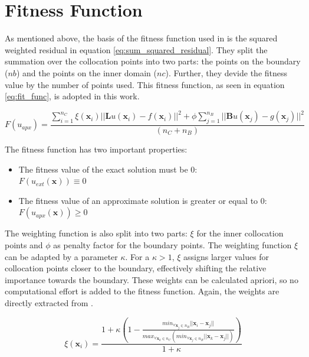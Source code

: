 \documentclass[./\jobname.tex]{subfiles}
\begin{document}
\section{Fitness Function}
\label{chap:fit_func}

As mentioned above, the basis of the fitness function used in \cite{chaquet_using_2019} is the squared weighted residual in equation \ref{eq:sum_squared_residual}. They split the summation over the collocation points into two parts: the points on the boundary ($nb$) and the points on the inner domain ($nc$). Further, they devide the fitness value by the number of points used. This fitness function, as seen in equation \ref{eq:fit_func}, is adopted in this work. 

\begin{equation}
\label{eq:fit_func}
F(u_{apx}) = \frac{\sum_{i=1}^{n_C} \xi (\mathbf{x}_i) || \mathbf{L}u(\mathbf{x}_i) - f(\mathbf{x}_i)||^2 + \phi \sum_{j=1}^{n_B} || \mathbf{B}u(\mathbf{x}_j) - g(\mathbf{x}_j)||^2}{(n_C + n_B)}  
\end{equation}

The fitness function has two important properties: 
\begin{itemize}
	\item The fitness value of the exact solution must be 0:\\
	$F(u_{ext}(\mathbf{x})) \equiv 0$ 
	\item The fitness value of an approximate solution is greater or equal to 0: \\
	$F(u_{apx}(\mathbf{x})) \geq 0$
\end{itemize}
 

The weighting function is also split into two parts: $\xi$ for the inner collocation points and $\phi$ as penalty factor for the boundary points. The weighting function $\xi$ can be adapted by a parameter $\kappa$. For a $\kappa > 1$, $\xi$ assigns larger values for collocation points closer to the boundary, effectively shifting the relative importance towards the boundary. These weights can be calculated apriori, so no computational effort is added to the fitness function. Again, the weights are directly extracted from \cite{chaquet_using_2019}. 

\begin{equation}
\label{eq:nc_weight}
\xi(\mathbf{x}_i) = \frac{1 + \kappa \left(1 - \frac{min_{\forall \mathbf{x}_j\in n_B}|| \mathbf{x}_i - \mathbf{x}_j ||}{max_{\forall\mathbf{x}_k \in n_C}(min_{\forall \mathbf{x}_j \in n_B} || \mathbf{x}_k - \mathbf{x}_j ||)}\right)}{1 + \kappa}
\end{equation}
\end{document}
